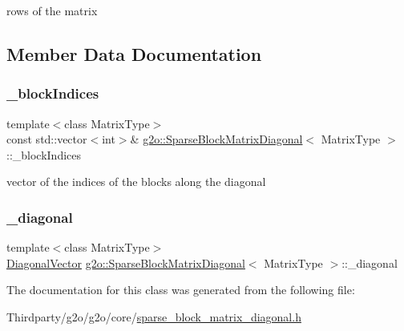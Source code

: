 rows of the matrix 



\subsection{Member Data Documentation}
\mbox{\label{classg2o_1_1_sparse_block_matrix_diagonal_a12ca3362997c3ca21c8b2a203177485e}} 
\subsubsection{\texorpdfstring{\+\_\+block\+Indices}{\_blockIndices}}
{\footnotesize\ttfamily template$<$class Matrix\+Type$>$ \\
const std\+::vector$<$int$>$\& \mbox{\hyperlink{classg2o_1_1_sparse_block_matrix_diagonal}{g2o\+::\+Sparse\+Block\+Matrix\+Diagonal}}$<$ Matrix\+Type $>$\+::\+\_\+block\+Indices\hspace{0.3cm}{\ttfamily [protected]}}



vector of the indices of the blocks along the diagonal 

\mbox{\label{classg2o_1_1_sparse_block_matrix_diagonal_a0679df785f9e7b79a1e9dfe623af5341}} 
\subsubsection{\texorpdfstring{\+\_\+diagonal}{\_diagonal}}
{\footnotesize\ttfamily template$<$class Matrix\+Type$>$ \\
\mbox{\hyperlink{classg2o_1_1_sparse_block_matrix_diagonal_a2eb7fc4130fac5c499b57f3bec855812}{Diagonal\+Vector}} \mbox{\hyperlink{classg2o_1_1_sparse_block_matrix_diagonal}{g2o\+::\+Sparse\+Block\+Matrix\+Diagonal}}$<$ Matrix\+Type $>$\+::\+\_\+diagonal\hspace{0.3cm}{\ttfamily [protected]}}



The documentation for this class was generated from the following file\+:\begin{DoxyCompactItemize}
\item 
Thirdparty/g2o/g2o/core/\mbox{\hyperlink{sparse__block__matrix__diagonal_8h}{sparse\+\_\+block\+\_\+matrix\+\_\+diagonal.\+h}}\end{DoxyCompactItemize}
